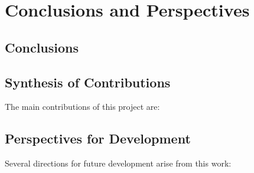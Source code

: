 \chapter{Conclusions and Perspectives}
\label{ch:conclusions}

\section{Conclusions}
\label{sec:conclusions}

\section{Synthesis of Contributions}
\label{sec:contributions}

The main contributions of this project are:

\section{Perspectives for Development}
\label{sec:perspectives}

Several directions for future development arise from this work:
